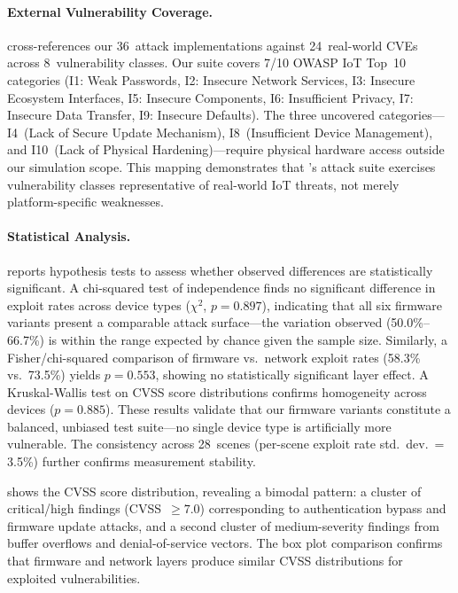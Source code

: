 \paragraph{External Vulnerability Coverage.}
 cross-references our 36~attack
implementations against 24~real-world CVEs across
8~vulnerability classes.  Our suite covers 7/10 OWASP IoT
Top~10~\cite{owasp-iot-top10} categories (I1: Weak Passwords,
I2: Insecure Network Services, I3: Insecure Ecosystem Interfaces,
I5: Insecure Components, I6: Insufficient Privacy,
I7: Insecure Data Transfer, I9: Insecure Defaults).
The three uncovered categories---I4~(Lack of Secure Update
Mechanism), I8~(Insufficient Device Management), and
I10~(Lack of Physical Hardening)---require physical hardware
access outside our simulation scope.  This mapping demonstrates
that \sys{}'s attack suite exercises vulnerability classes
representative of real-world IoT threats, not merely
platform-specific weaknesses.



\paragraph{Statistical Analysis.}
 reports hypothesis tests to assess whether
observed differences are statistically significant.  A chi-squared
test of independence finds no significant difference in exploit rates
across device types ($\chi^2$, $p = 0.897$), indicating that all
six firmware variants present a comparable attack surface---the
variation observed (50.0\%--66.7\%) is within the range expected
by chance given the sample size.  Similarly, a Fisher/chi-squared
comparison of firmware vs.\ network exploit rates (58.3\% vs.\
73.5\%) yields $p = 0.553$, showing no statistically significant
layer effect.  A Kruskal-Wallis test on CVSS score distributions
confirms homogeneity across devices ($p = 0.885$).  These results
validate that our firmware variants constitute a balanced, unbiased
test suite---no single device type is artificially more vulnerable.
The consistency across 28~scenes (per-scene exploit rate
std.\ dev.\ = 3.5\%) further confirms measurement stability.



 shows the CVSS score distribution,
revealing a bimodal pattern: a cluster of critical/high findings
(CVSS~$\geq 7.0$) corresponding to authentication bypass and
firmware update attacks, and a second cluster of medium-severity
findings from buffer overflows and denial-of-service vectors.
The box plot comparison confirms that firmware and network layers
produce similar CVSS distributions for exploited vulnerabilities.

